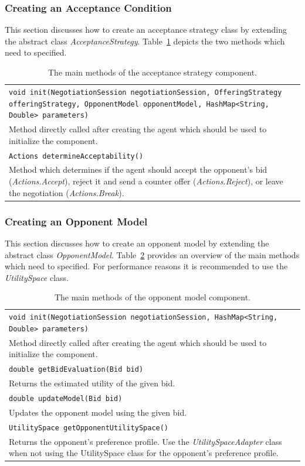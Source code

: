 \documentclass[]{article}
\begin{document}
\subsubsection{Creating an Acceptance Condition}
This section discusses how to create an acceptance strategy class by extending the abstract class \textit{AcceptanceStrategy}. Table~\ref{tab:BOAas} depicts the two methods which need to specified.

\begin{table}[h]
\begin{tabular}{m{}}
\hline
\texttt{void init(NegotiationSession negotiationSession, OfferingStrategy offeringStrategy,
						OpponentModel opponentModel, HashMap<String, Double> parameters)}\\
Method directly called after creating the agent which should be used to initialize the component.\\
\hline
\texttt{Actions determineAcceptability()}\\
Method which determines if the agent should accept the opponent's bid (\textit{Actions.Accept}), reject it and send a counter offer (\textit{Actions.Reject}), or leave the negotiation (\textit{Actions.Break}).\\
\hline
\end{tabular}
\caption{The main methods of the acceptance strategy component.}
\label{tab:BOAas}
\end{table}

\subsubsection{Creating an Opponent Model}
This section discusses how to create an opponent model by extending the abstract class \textit{OpponentModel}. Table~\ref{tab:BOAom} provides an overview of the main methods which need to specified. For performance reasons it is recommended to use the \textit{UtilitySpace} class.

\begin{table}[h]
\begin{tabular}{m{}}
\hline
\texttt{void init(NegotiationSession negotiationSession, HashMap<String, Double> parameters)}\\
Method directly called after creating the agent which should be used to initialize the component.\\
\hline
\texttt{double getBidEvaluation(Bid bid)}\\
Returns the estimated utility of the given bid.\\
\hline
\texttt{double updateModel(Bid bid)}\\
Updates the opponent model using the given bid.\\
\hline
\texttt{UtilitySpace getOpponentUtilitySpace()}\\
Returns the opponent's preference profile. Use the \textit{UtilitySpaceAdapter} class when not using the UtilitySpace class for the opponent's preference profile.\\
\hline
\end{tabular}
\caption{The main methods of the opponent model component.}
\label{tab:BOAom}
\end{table}
\end{document}
